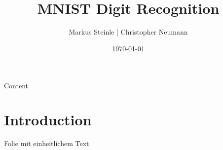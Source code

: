 \documentclass[aspectratio=169]{beamer} %
\title{
  \Huge MNIST Digit Recognition \\}
\author{Markus Steinle | Christopher Neumann}
\institute{Ruprecht-Karls-University Heidelberg \\  
 \textit{Reconfigurable Embedded Systems, 2026} %
}
\date{\today} %
\begin{document}

\begin{frame} %
\titlepage %
\end{frame} %


 \begin{frame}{Content} %
 \tableofcontents %
 \end{frame}


\section{Introduction} %

\begin{frame}{Folie mit einheitlichem Text}
\lipsum[1]
\end{frame}

\end{document}
